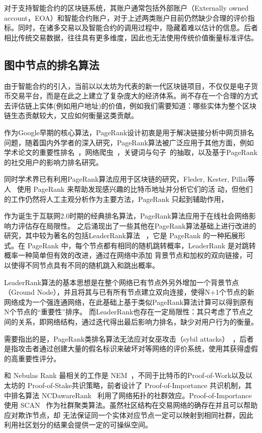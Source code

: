 对于支持智能合约的区块链系统，其账户通常包括外部账户（Externally owned account，EOA）和智能合约账户，对于上述两类账户目前仍然缺少合理的评价指标。同时，在诸多交易以及智能合约的调用过程中，隐藏着难以估计的信息。后者相比传统交易数据，往往具有更多维度，因此也无法使用传统价值衡量标准评估。





\subsection{图中节点的排名算法}
由于智能合约的引入，当前以以太坊为代表的新一代区块链项目，不仅仅是电子货币交易平台，而是在此之上建立了复杂庞大的经济体系。尚不存在一个合理的方式去评估链上实体(例如用户地址)的价值，例如我们需要知道：哪些实体为整个区块链生态贡献较大，又应如何衡量这类贡献。

作为Google早期的核心算法，PageRank设计初衷是用于解决链接分析中网页排名问题，随着国内外学者的深入研究，PageRank算法被广泛应用于其他方面，例如学术论文的重要性排名~\cite{}，网络爬虫~\cite{}，关键词与句子~\cite{}的抽取，以及基于PageRank的社交用户的影响力排名研究。

同时学术界已有利用PageRank算法应用于区块链的研究，Fleder, Kester, Pillai等人~\cite{Fleder2015} 使用 PageRank 来帮助发现感兴趣的比特币地址并分析它们的活 动，但他们的工作仍然将人工主观分析作为主要方法，PageRank 只起到辅助作用，

作为诞生于互联网2.0时期的经典排名算法，PageRank算法应用于在线社会网络影响力评估存在局限性。
之后涌现出了一些其他在PageRank算法基础上进行改进的研究，其中较为著名的包括LeaderRank算法 ~\cite{Li2014}，它是 PageRank 的一种拓展形式。在 PageRank 中，每个节点都有相同的随机跳转概率，LeaderRank 是对跳转概率一种简单但有效的改进，通过在网络中添加 背景节点和加权的双向链接，可以使得不同节点具有不同的随机跳入和跳出概率。

LeaderRank算法的基本思想是在整个网络已有节点外另外增加一个背景节点（Ground Node），并且将其与已有所有节点建立双向连接，使得N+1个节点的新网络成为一个强连通网络，在此基础上基于类似PageRank算法计算可以得到原有N个节点的“重要性”排序。
而LeaderRank也存在一定局限性：其只考虑了节点之间的关系，即网络结构，通过迭代得出最后影响力排名，缺少对用户行为的衡量。

需要指出的是，PageRank类排名算法无法应对女巫攻击（sybil attacks）~\cite{cheng2006manipulability}，后者是指攻击者通过创建大量的假名标识来破坏对等网络的评价系统，使用其获得虚假的高重要性评分。


和 Nebulas Rank 最相关的工作是 NEM~\cite{nem}，不同于比特币的Proof-of-Work以及以太坊的 Proof-of-Stake共识策略，前者设计了 Proof-of-Importance 共识机制，其中排名算法 NCDawareRank ~\cite{Nikolakopoulos2013}利用了网络拓扑的社群效应。Proof-of-Importance 使用 SCAN ~\cite{xu2007scan}\cite{shiokawa2015scan}\cite{chang2017mathsf}作为社群聚类算法。虽然社区结构在交易网络的确存在并且可以帮助应对欺诈节点，却 无法保证同一个实体对应节点一定可以映射到相同社群，因此利用社区划分的结果会提供一定的可操纵空间。

